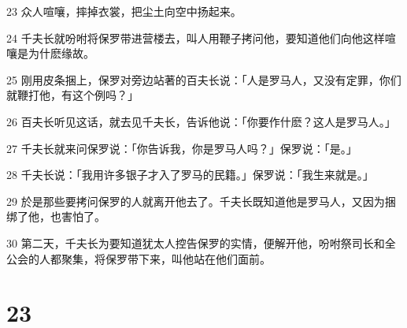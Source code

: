 \par 23 众人喧嚷，摔掉衣裳，把尘土向空中扬起来。
\par 24 千夫长就吩咐将保罗带进营楼去，叫人用鞭子拷问他，要知道他们向他这样喧嚷是为什麽缘故。
\par 25 刚用皮条捆上，保罗对旁边站著的百夫长说：「人是罗马人，又没有定罪，你们就鞭打他，有这个例吗？」
\par 26 百夫长听见这话，就去见千夫长，告诉他说：「你要作什麽？这人是罗马人。」
\par 27 千夫长就来问保罗说：「你告诉我，你是罗马人吗？」保罗说：「是。」
\par 28 千夫长说：「我用许多银子才入了罗马的民籍。」保罗说：「我生来就是。」
\par 29 於是那些要拷问保罗的人就离开他去了。千夫长既知道他是罗马人，又因为捆绑了他，也害怕了。
\par 30 第二天，千夫长为要知道犹太人控告保罗的实情，便解开他，吩咐祭司长和全公会的人都聚集，将保罗带下来，叫他站在他们面前。

\chapter{23}

